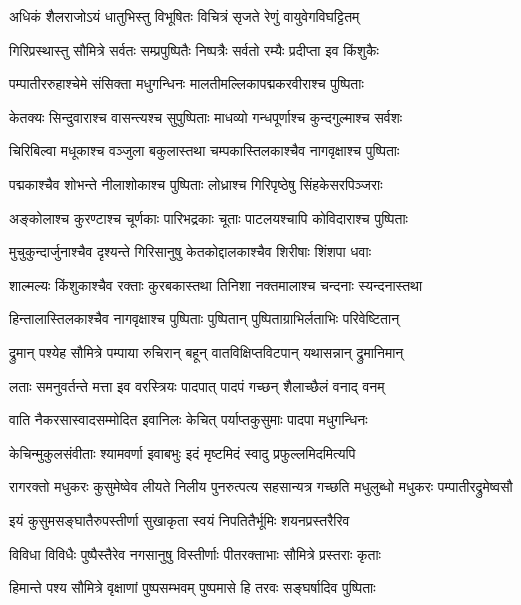 \twolineshloka
{अधिकं शैलराजोऽयं धातुभिस्तु विभूषितः}
{विचित्रं सृजते रेणुं वायुवेगविघट्टितम्} %

\twolineshloka
{गिरिप्रस्थास्तु सौमित्रे सर्वतः सम्प्रपुष्पितैः}
{निष्पत्रैः सर्वतो रम्यैः प्रदीप्ता इव किंशुकैः} %

\twolineshloka
{पम्पातीररुहाश्चेमे संसिक्ता मधुगन्धिनः}
{मालतीमल्लिकापद्मकरवीराश्च पुष्पिताः} %

\twolineshloka
{केतक्यः सिन्दुवाराश्च वासन्त्यश्च सुपुष्पिताः}
{माधव्यो गन्धपूर्णाश्च कुन्दगुल्माश्च सर्वशः} %

\twolineshloka
{चिरिबिल्वा मधूकाश्च वञ्जुला बकुलास्तथा}
{चम्पकास्तिलकाश्चैव नागवृक्षाश्च पुष्पिताः} %

\twolineshloka
{पद्मकाश्चैव शोभन्ते नीलाशोकाश्च पुष्पिताः}
{लोध्राश्च गिरिपृष्ठेषु सिंहकेसरपिञ्जराः} %

\twolineshloka
{अङ्कोलाश्च कुरण्टाश्च चूर्णकाः पारिभद्रकाः}
{चूताः पाटलयश्चापि कोविदाराश्च पुष्पिताः} %

\twolineshloka
{मुचुकुन्दार्जुनाश्चैव दृश्यन्ते गिरिसानुषु}
{केतकोद्दालकाश्चैव शिरीषाः शिंशपा धवाः} %

\twolineshloka
{शाल्मल्यः किंशुकाश्चैव रक्ताः कुरबकास्तथा}
{तिनिशा नक्तमालाश्च चन्दनाः स्यन्दनास्तथा} %

\twolineshloka
{हिन्तालास्तिलकाश्चैव नागवृक्षाश्च पुष्पिताः}
{पुष्पितान् पुष्पिताग्राभिर्लताभिः परिवेष्टितान्} %

\twolineshloka
{द्रुमान् पश्येह सौमित्रे पम्पाया रुचिरान् बहून्}
{वातविक्षिप्तविटपान् यथासन्नान् द्रुमानिमान्} %

\twolineshloka
{लताः समनुवर्तन्ते मत्ता इव वरस्त्रियः}
{पादपात् पादपं गच्छन् शैलाच्छैलं वनाद् वनम्} %

\twolineshloka
{वाति नैकरसास्वादसम्मोदित इवानिलः}
{केचित् पर्याप्तकुसुमाः पादपा मधुगन्धिनः} %

\twolineshloka
{केचिन्मुकुलसंवीताः श्यामवर्णा इवाबभुः}
{इदं मृष्टमिदं स्वादु प्रफुल्लमिदमित्यपि} %

\threelineshloka
{रागरक्तो मधुकरः कुसुमेष्वेव लीयते}
{निलीय पुनरुत्पत्य सहसान्यत्र गच्छति}
{मधुलुब्धो मधुकरः पम्पातीरद्रुमेष्वसौ} %

\twolineshloka
{इयं कुसुमसङ्घातैरुपस्तीर्णा सुखाकृता}
{स्वयं निपतितैर्भूमिः शयनप्रस्तरैरिव} %

\twolineshloka
{विविधा विविधैः पुष्पैस्तैरेव नगसानुषु}
{विस्तीर्णाः पीतरक्ताभाः सौमित्रे प्रस्तराः कृताः} %

\twolineshloka
{हिमान्ते पश्य सौमित्रे वृक्षाणां पुष्पसम्भवम्}
{पुष्पमासे हि तरवः सङ्घर्षादिव पुष्पिताः} %

